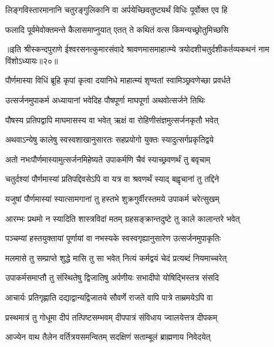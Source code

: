 \twolineshloka
{लिङ्गविस्तारमानानि चतुरङ्गुलिकानि वा}
{अर्पयेच्छिवतुष्ट्यर्थं विधिः पूर्वोक्त एव हि} %

\twolineshloka
{फलादि पूर्वमेवोक्तमन्ते कैलासमाप्नुयात्}
{एतत् ते कथितं वत्स किमन्यच्छ्रोतुमिच्छसि} %


{॥इति श्रीस्कन्दपुराणे ईश्वरसनत्कुमारसंवादे श्रावणमासमाहात्म्ये त्रयोदशीचतुर्दशीकर्तव्यकथनं नाम विंशोऽध्यायः॥२०॥}





\twolineshloka
{पौर्णमास्या विधिं ब्रूहि कृपां कृत्वा दयानिधे}
{माहात्म्यं शृण्वतां स्वामिञ्छ्रवणेच्छा प्रवर्धते} %


\twolineshloka
{उत्सर्जनमुपाकर्म अध्यायानां भवेदिह}
{पौषपूर्णा माघपूर्णा अथवोत्सर्जने तिथिः} %

\twolineshloka
{पौषस्य प्रतिपद्वापि माघमासस्य वा भवेत्}
{ऋक्षं वा रोहिणीसंज्ञमुत्सर्जनकृतौ भवेत्} %

\twolineshloka
{अथवाऽन्येषु कालेषु स्वस्वशाखानुसारतः}
{सहप्रयोगो युक्तः स्यादुत्सर्गप्रकृतिद्वये} %

\twolineshloka
{अतो नभःपौर्णमास्यामुत्सर्जनमिहेष्यते}
{उपाकर्मणि चैवं स्याच्छ्रवणर्थं तु बवृचाम्} %

\twolineshloka
{चतुर्दश्यां पौर्णमास्यां प्रतिपद्दिवसेऽपि वा}
{यत्र वा श्रवणर्थं स्याद् बह्वृचानां तु तद्दिने} %

\twolineshloka
{यजुषां पौर्णमास्यां स्यात्सामगानां तु हस्तभे}
{शुक्रगुर्वीरस्तमये उपाकर्म चरेत्सुखम्} %

\twolineshloka
{आरम्भः प्रथमो न स्यादिति शास्त्रविदां मतम्}
{ग्रहसङ्क्रान्तदुष्टे तु काले कालान्तरे भवेत्} %

\twolineshloka
{पञ्चम्यां हस्तयुक्तायां पूर्णायां वा नभस्यके}
{स्वस्वगृह्यानुसारेण उत्सर्जनमुपाकृतिः} %

\twolineshloka
{मलमासे तु सम्प्राप्ते शुद्धे मासि तु सा भवेत्}
{नित्यं कर्मद्वयं चेदं प्रत्यब्दं नियमाच्चरेत्} %

\twolineshloka
{उपाकर्मसमाप्तौ तु संस्थितेषु द्विजातिषु}
{अर्पणीयः सभादीपो योषिद्भिस्तत्र संसदि} %

\twolineshloka
{आचार्यः प्रतिगृह्णाति दद्याद्वान्यद्विजातये}
{सौवर्णे राजते वापि पात्रे ताम्रमयेऽपि वा} %

\twolineshloka
{प्रस्थमात्रं तु गोधूमा दीपं तत्पिष्टसम्भवम्}
{दीपपात्रं संविधाय ज्वालयेत्तत्र दीपकम्} %

\twolineshloka
{आज्येन वाथ तैलेन वर्तित्रयसमन्वितम्}
{सदक्षिणं सताम्बूलं ब्राह्मणाय निवेदयेत्} %

